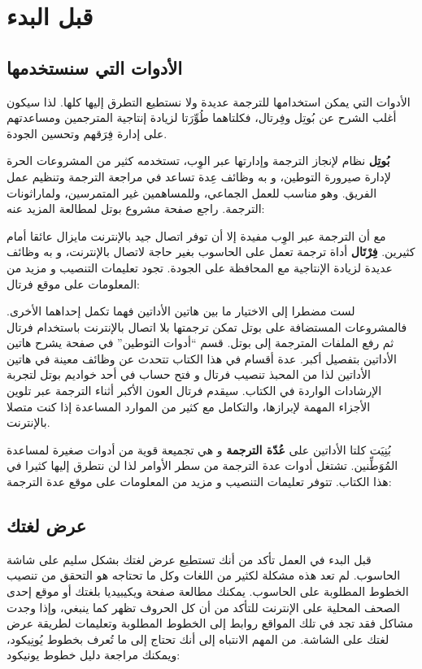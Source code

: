 \chapter{قبل البدء}
\section[ref:20165030]{الأدوات التي سنستخدمها}
الأدوات التي يمكن استخدامها
للترجمة عديدة ولا نستطيع التطرق إليها كلها. لذا سيكون أغلب الشرح عن
بُوتِل وفِرتال، فكلتاهما طُوِّرَتا لزيادة إنتاجية المترجمين ومساعدتهم
على إدارة فِرَقهم وتحسين الجودة.

{\bf بُوتِل} نظام لإنجاز الترجمة وإدارتها عبر الوِب، تستخدمه كثير من
المشروعات الحرة لإدارة صيرورة التوطين، و به وظائف عِدة تساعد في مراجعة
الترجمة وتنظيم عمل الفريق. وهو مناسب للعمل الجماعي، وللمساهمين غير
المتمرسين، ولماراثونات الترجمة. راجع صفحة مشروع بوتل لمطالعة المزيد
عنه:


مع أن الترجمة عبر الوِب مفيدة إلا أن توفر اتصال جيد بالإنترنت مايزال
عائقا أمام كثيرين. {\bf فِرْتَال} أداة ترجمة تعمل على الحاسوب بغير حاجة
لاتصال بالإنترنت، و به وظائف عديدة لزيادة الإنتاجية مع المحافظة على
الجودة. تجود تعليمات التنصيب و مزيد من المعلومات على موقع فرتال:


لست مضطرا إلى الاختيار ما بين هاتين الأداتين فهما تكمل إحداهما الأخرى.
فالمشروعات المستضافة على بوتل تمكن ترجمتها بلا اتصال بالإنترنت باستخدام
فرتال ثم رفع الملفات المترجمة إلى بوتل. قسم “أدوات التوطين” في صفحة
\at[ref:30364807] يشرح هاتين الأداتين بتفصيل أكبر. عدة أقسام
في هذا الكتاب تتحدث عن وظائف معينة في هاتين الأداتين لذا من المحبذ
تنصيب فرتال و فتح حساب في أحد خواديم بوتل لتجربة الإرشادات الواردة في
الكتاب. سيقدم فرتال العون الأكبر أثناء الترجمة عبر تلوين الأجزاء المهمة
لإبرازها، والتكامل مع كثير من الموارد المساعدة إذا كنت متصلا بالإنترنت.

بُنِيَت كلتا الأداتين على {\bf عُدّة الترجمة} و هي تجميعة قوية من أدوات
صغيرة لمساعدة المُوَطِّنين. تشتغل أدوات عدة الترجمة من سطر الأوامر لذا
لن نتطرق إليها كثيرا في هذا الكتاب. تتوفر تعليمات التنصيب و مزيد من
المعلومات على موقع عدة الترجمة:


\section{عرض لغتك}
قبل البدء في العمل تأكد من أنك تستطيع عرض لغتك بشكل سليم على شاشة
الحاسوب. لم تعد هذه مشكلة لكثير من اللغات وكل ما تحتاجه هو التحقق من
تنصيب الخطوط المطلوبة على الحاسوب. يمكنك مطالعة صفحة ويكيبيديا بلغتك أو
موقع إحدى الصحف المحلية على الإنترنت للتأكد من أن كل الحروف تظهر كما
ينبغي، وإذا وجدت مشاكل فقد تجد في تلك المواقع روابط إلى الخطوط المطلوبة
وتعليمات لطريقة عرض لغتك على الشاشة. من المهم الانتباه إلى أنك تحتاج
إلى ما تُعرف بخطوط يُونِيكود، ويمكنك مراجعة دليل خطوط يونيكود:

